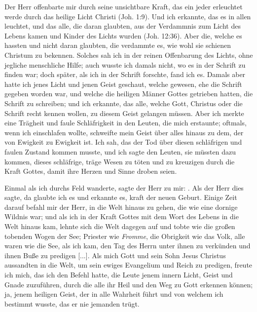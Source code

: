 Der Herr offenbarte mir durch seine unsichtbare Kraft, das
ein jeder erleuchtet werde durch das heilige Licht Christi 
(Joh. 1:9).
Und ich erkannte, das es in allen leuchtet, und das alle, die
daran glaubten, aus der Verdammnis zum Licht des Lebens
kamen und Kinder des Lichts 
wurden (Joh. 12:36). Aber die,
welche es hassten und nicht daran glaubten, die verdammte es, 
wie wohl sie schienen Christum zu bekennen. Solches sah ich in der
reinen Offenbarung des Lichts, ohne jegliche menschliche Hilfe;
auch wusste ich damals nicht, wo es in der Schrift zu finden
war; doch später, als ich in der Schrift forschte, fand ich es.
Damals aber hatte ich jenes Licht und jenen Geist geschaut, welche
gewesen, ehe die Schrift gegeben worden war, 
und welche die
heiligen Männer Gottes getrieben hatten, die Schrift zu schreiben;
und ich erkannte, das alle, welche Gott, Christus oder die Schrift
recht kennen wollen, zu diesem Geist gelangen 
müssen. Aber ich
merkte eine Trägheit und faule Schläfrigkeit in den Leuten, die
mich erstaunte; oftmals, wenn ich einschlafen wollte, schweifte
mein Geist über alles hinaus zu dem, der von Ewigkeit zu 
Ewigkeit ist. Ich sah, das der Tod über diesen schläfrigen und faulen
Zustand kommen musste, und ich sagte den Leuten, sie müssten
dazu kommen, dieses schläfrige, träge Wesen zu töten und zu
kreuzigen durch die Kraft Gottes, damit ihre Herzen und Sinne
droben seien.

Einmal als ich durchs Feld wanderte, sagte der Herr zu mir:
. Als der Herr dies sagte,
da glaubte ich es und erkannte es, kraft der neuen Geburt. Einige
Zeit darauf befahl mir der Herr, in die Welt hinaus zu gehen,
die wie eine dornige Wildnis war; und als ich in der Kraft
Gottes mit dem Wort des Lebens in die Welt hinaus kam, lehnte
sich die Welt dagegen auf und tobte wie die großen tobenden
Wogen der See; Priester wie \textit{Fromme}, die Obrigkeit wie das
Volk, alle waren wie die See, als ich kam, den Tag des Herrn 
unter ihnen zu verkünden und ihnen Buße zu predigen [...].
Als mich Gott und sein Sohn Jesus Christus aussandten
in die Welt, um sein ewiges Evangelium und Reich zu predigen,
freute ich mich, das ich den Befehl hatte, die Leute jenem innern
Licht, Geist und Gnade zuzuführen, durch die alle ihr Heil und
den Weg zu Gott erkennen können; ja, jenem heiligen Geist,
der in alle Wahrheit führt und von welchem ich bestimmt wusste,
das er nie jemanden trügt.

